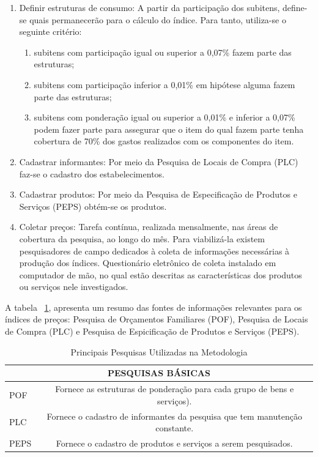 \documentclass[twoside,a4paper,12pt]{report}
\begin{document}
\begin{enumerate}
\begin{enumerate}
  \end{enumerate}
  \item Definir estruturas de consumo: A partir da participação dos subitens, define-se quais permanecerão para o cálculo do índice. Para tanto, utiliza-se o seguinte critério:
    \begin{enumerate}
    \item subitens com participação igual ou superior a 0,07\% fazem parte das estruturas;
    \item subitens com participação inferior a 0,01\% em hipótese alguma fazem parte das estruturas;
    \item subitens com ponderação igual ou superior a 0,01\% e inferior a 0,07\% podem fazer parte para assegurar que o item do qual fazem parte tenha cobertura de 70\% dos gastos realizados com os componentes do item.
    \end{enumerate}
  \item Cadastrar informantes: Por meio da Pesquisa de Locais de Compra (PLC) faz-se o cadastro dos estabelecimentos.
  \item Cadastrar produtos: Por meio da Pesquisa de Especificação de Produtos e Serviços (PEPS) obtém-se os produtos.
  \item Coletar preços: Tarefa contínua, realizada mensalmente, nas áreas de cobertura da pesquisa, ao longo do mês. Para viabilizá-la existem pesquisadores de campo dedicados à coleta de informações necessárias à produção dos índices. Questionário eletrônico de coleta instalado em computador de mão, no qual estão descritas as características dos produtos ou serviços nele investigados.
\end{enumerate}

A tabela ~\ref{table:01}, apresenta um resumo das fontes de informações relevantes para os índices de preços: Pesquisa de Orçamentos Familiares (POF), Pesquisa de Locais de Compra (PLC) e Pesquisa de Espicificação de Produtos e Serviços (PEPS).

\begin{table}[h]
\centering
\begin{tabular}{lc}
\hline
\multicolumn{2}{c}{PESQUISAS BÁSICAS}                                            \\ \hline
POF & Fornece as estruturas de ponderação para cada grupo de bens e serviços).   \\
PLC & Fornece o cadastro de informantes da pesquisa que tem manutenção constante.\\ 
PEPS & Fornece o cadastro de produtos e serviços a serem pesquisados.            \\ \hline
\end{tabular}
\caption{Principais Pesquisas Utilizadas na Metodologia}
\label{table:01}
\end{table}
\end{document}
